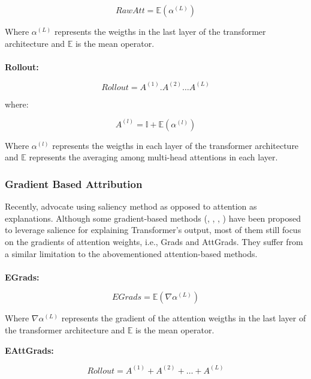 \begin{equation}
    RawAtt=\mathbb{E}(\alpha ^ {(L)})
\end{equation}

Where $\alpha ^ {(L)}$ represents the weigths in the last layer of the transformer architecture and $\mathbb{E}$ is the mean operator.
\\\\

\textbf{Rollout:}

\begin{equation}
    Rollout=A^{(1)} . A^{(2)} \dots A^{(L)}
\end{equation}

where:

\begin{equation}
    A^{(l)}=\mathbb{I}+\mathbb{E}(\alpha ^ {(l)})
\end{equation}

Where $\alpha ^ {(l)}$ represents the weigths in each layer of the transformer architecture and $\mathbb{E}$ represents the averaging
among multi-head attentions in each layer.


\subsubsection{Gradient Based Attribution}

Recently, \cite{bastings2020elephant} advocate using saliency method as opposed to attention as explanations. Although some gradient-based methods (\cite{li2022saliency}, \cite{hao2021self}, \cite{barkan2021grad}, \cite{chrysostomou2021enjoy}) have been proposed to leverage salience for explaining Transformer’s output, most of them still focus on the gradients of attention weights, i.e., Grads and AttGrads. They suffer from a similar limitation to the abovementioned attention-based methods.
\\\\
\textbf{EGrads:}

\begin{equation}
    EGrads=\mathbb{E}(\nabla \alpha ^ {(L)})
\end{equation}

Where $\nabla \alpha ^ {(L)}$ represents the gradient of the attention weigths in the last layer of the transformer architecture and $\mathbb{E}$ is the mean operator.
\newpage

\textbf{EAttGrads:}

\begin{equation}
    Rollout=A^{(1)} + A^{(2)} + \dots + A^{(L)}
\end{equation}

